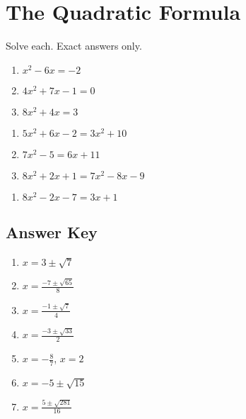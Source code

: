 \chapter{The Quadratic Formula}

Solve each. Exact answers only.

\begin{multicols}{3}
\begin{enumerate}
	\item $x^2-6x=-2$
	\item $4x^2 + 7x - 1 = 0$
    \item $8x^2 + 4x = 3$
\end{enumerate}	\setcounter{Review}{\value{enumi}}
\end{multicols}
\begin{multicols}{3}
\begin{enumerate}		\setcounter{enumi}{\value{Review}}
    \item $5x^2 + 6x - 2 = 3x^2 + 10$
    \item $7x^2-5 = 6x+11$
    \item $8x^2+2x+1=7x^2-8x-9$
\end{enumerate}	\setcounter{Review}{\value{enumi}}
\end{multicols}
\begin{multicols}{3}
\begin{enumerate}		\setcounter{enumi}{\value{Review}}
    \item $8x^2 - 2x - 7 = 3x + 1$
\end{enumerate}	\setcounter{Review}{\value{enumi}}
\end{multicols}


\newpage

\section{Answer Key}

\begin{enumerate}
	\item $x = 3 \pm \sqrt{7}$
	\item $x = \frac{-7 \pm \sqrt{65}}{8}$
    \item $x = \frac{-1 \pm \sqrt{7}}{4}$
    \item $x = \frac{-3 \pm \sqrt{33}}{2}$
    \item $x = -\frac{8}{7}$, $x = 2$
    \item $x = -5 \pm \sqrt{15}$
    \item $x = \frac{5 \pm \sqrt{281}}{16}$
\end{enumerate}
